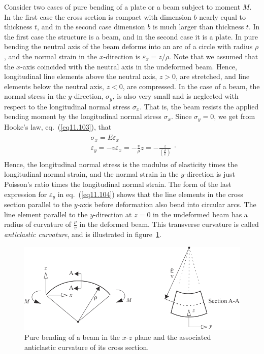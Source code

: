\documentclass{AeroStructure-ERJohnson}
\begin{document}
Consider two cases of pure bending of a plate or a beam subject to moment $M$. In the first case the cross section is compact with dimension $b$ nearly equal to thickness $t$, and in the second case dimension $b$ is much larger than thickness $t$. In the first case the structure is a beam, and in the second case it is a plate. In pure bending the neutral axis of the beam deforms into an arc of a circle with radius $\rho$, and the normal strain in the $x$-direction is $\varepsilon_{x}=z/\rho$. Note that we assumed that the $x$-axis coincided with the neutral axis in the undeformed beam. Hence, longitudinal line elements above the neutral axis, $z>0$, are stretched, and line elements below the neutral axis, $z<0$, are compressed. In the case of a beam, the normal stress in the $y$-direction, $\sigma_{y}$, is also very small and is neglected with respect to the longitudinal normal stress $\sigma_{x}$. That is, the beam resists the applied bending moment by the longitudinal normal stress $\sigma_{x}$. Since $\sigma_{y}=0$, we get from Hooke's law, eq.~(\ref{eq11.103}),\vspace*{-3pt} that
\begin{align}\label{eq11.104}
\begin{gathered} \sigma_{x}=E \varepsilon_{x} \\
\varepsilon_{y}=-v \varepsilon_{x}=-\frac{v}{\rho} z=-\frac{z}{\left(\frac{\rho}{v}\right)} \end{gathered}.
\end{align}
Hence, the longitudinal normal stress is the modulus of elasticity times the longitudinal normal strain, and the normal strain in the $y$-direction is just Poisson's ratio times the longitudinal normal strain. The form\vadjust{\vspace*{8pt}\pagebreak} of the last expression for $\varepsilon_{{y}}$ in eq.~(\ref{eq11.104}) shows that the line elements in the cross section parallel to the $y$-axis before deformation also bend into circular arcs. The line element parallel to the $y$-direction at $z=0$ in the undeformed beam has a radius of curvature of $\frac{\rho}{v}$ in the deformed beam. This transverse curvature is called \textit{anticlastic curvature}, and is illustrated in figure~\ref{fig11.23}.

\begin{figure}[!h]\vspace*{-4pt}
\centerline{\includegraphics{Figure_11-23.pdf}}
\caption{Pure bending of a beam in the $x$-$z$ plane and the associated anticlastic curvature of its cross section.} \label{fig11.23}\vspace*{-4pt}
\end{figure}
\end{document}
